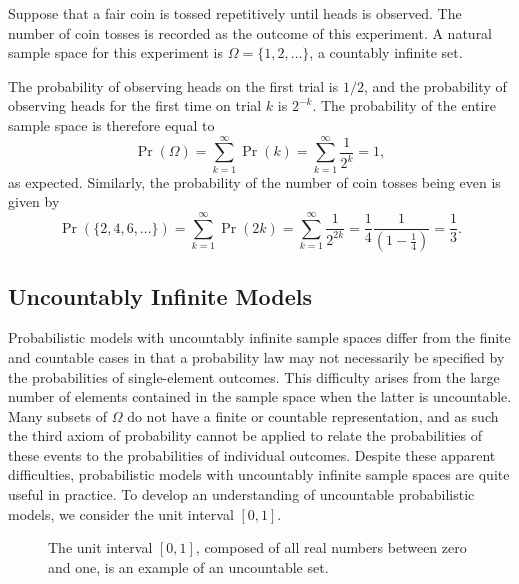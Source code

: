\begin{example} \label{example:CoinTossSequence}
Suppose that a fair coin is tossed repetitively until heads is observed.
The number of coin tosses is recorded as the outcome of this experiment.
A natural sample space for this experiment is $\Omega = \{ 1, 2, \ldots \}$, a countably infinite set.

The probability of observing heads on the first trial is $1/2$, and the probability of observing heads for the first time on trial $k$ is $2^{-k}$.
The probability of the entire sample space is therefore equal to
\begin{equation*}
\Pr ( \Omega ) = \sum_{k=1}^{\infty} \Pr (k)
= \sum_{k=1}^{\infty} \frac{1}{2^k} = 1 ,
\end{equation*}
as expected.
Similarly, the probability of the number of coin tosses being even is given by
\begin{equation*}
\Pr ( \{ 2, 4, 6, \ldots \} )
= \sum_{k=1}^{\infty} \Pr (2k)
= \sum_{k = 1}^{\infty} \frac{1}{2^{2k}}
= \frac{1}{4} \frac{1}{ \left( 1 - \frac{1}{4} \right) }
= \frac{1}{3} .
\end{equation*}
\end{example}


\subsection{Uncountably Infinite Models}

Probabilistic models with uncountably infinite sample spaces differ from the finite and countable cases in that a probability law may not necessarily be specified by the probabilities of single-element outcomes.
This difficulty arises from the large number of elements contained in the sample space when the latter is uncountable.
Many subsets of $\Omega$ do not have a finite or countable representation, and as such the third axiom of probability cannot be applied to relate the probabilities of these events to the probabilities of individual outcomes.
Despite these apparent difficulties, probabilistic models with uncountably infinite sample spaces are quite useful in practice.
To develop an understanding of uncountable probabilistic models, we consider the unit interval $[0, 1]$.

\begin{figure}[htb!]
\begin{center}
\begin{footnotesize}
\end{footnotesize}
\caption{The unit interval $[0,1]$, composed of all real numbers between zero and one, is an example of an uncountable set.}
\end{center}
\end{figure}

